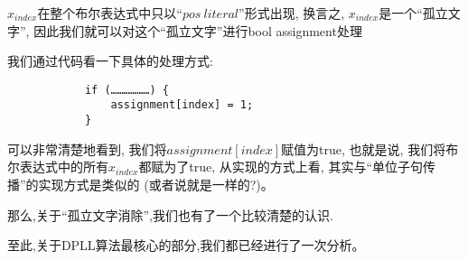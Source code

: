         $x_{index}$在整个布尔表达式中只以``$pos \ literal$''形式出现,
        换言之,
        $x_{index}$是一个``孤立文字'',
        因此我们就可以对这个``孤立文字''进行bool assignment处理
        \par
        我们通过代码看一下具体的处理方式:
        \begin{lstlisting}
            if (………………) {
                assignment[index] = 1; 
            }
        \end{lstlisting}
        \par
        可以非常清楚地看到,
        我们将$assignment[index]$赋值为true,
        也就是说,
        我们将布尔表达式中的所有$x_{index}$都赋为了true,
        从实现的方式上看,
        其实与``单位子句传播''的实现方式是类似的
        (或者说就是一样的?)。
        \par
        那么,关于``孤立文字消除'',我们也有了一个比较清楚的认识.
        \par
        至此,关于DPLL算法最核心的部分,我们都已经进行了一次分析。
